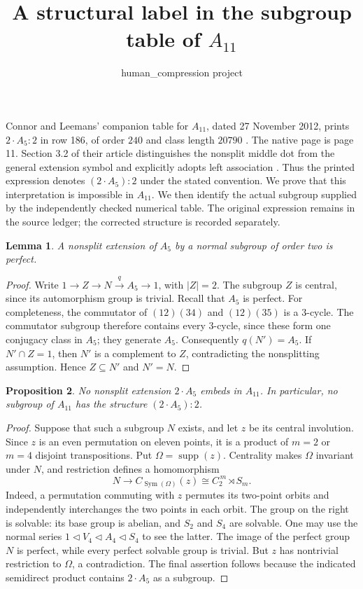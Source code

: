 \documentclass[11pt]{article}
\title{A structural label in the subgroup table of $A_{11}$}
\author{human\_compression project}
\date{}
\newtheorem{proposition}{Proposition}
\newtheorem{lemma}[proposition]{Lemma}
\newcommand{\Sym}{\operatorname{Sym}}
\begin{document}
\maketitle

Connor and Leemans' companion table for $A_{11}$, dated 27 November
2012, prints $2\cdot A_5:2$ in row 186, of order $240$ and class length
$20790$ \cite{table}. The native page is page 11. Section 3.2 of their
article distinguishes the nonsplit middle dot from the general extension
symbol and explicitly adopts left association \cite[p.~263]{atlas}.
Thus the printed expression denotes $(2\cdot A_5):2$ under the stated
convention. We prove that this interpretation is impossible in $A_{11}$.
We then identify the actual subgroup supplied by the independently checked
numerical table. The original expression remains in the source ledger;
the corrected structure is recorded separately.

\begin{lemma}
A nonsplit extension of $A_5$ by a normal subgroup of order two is perfect.
\end{lemma}
\begin{proof}
Write $1\to Z\to N\xrightarrow{q}A_5\to1$, with $|Z|=2$.
The subgroup $Z$ is central, since its automorphism group is trivial.
Recall that $A_5$ is perfect. For completeness, the commutator of
$(12)(34)$ and $(12)(35)$ is a $3$-cycle. The commutator subgroup
therefore contains every $3$-cycle, since these form one conjugacy class
in $A_5$; they generate $A_5$.
Consequently $q(N')=A_5$. If $N'\cap Z=1$, then $N'$ is a complement
to $Z$, contradicting the nonsplitting assumption. Hence $Z\subseteq N'$
and $N'=N$.
\end{proof}

\begin{proposition}
No nonsplit extension $2\cdot A_5$ embeds in $A_{11}$. In particular,
no subgroup of $A_{11}$ has the structure $(2\cdot A_5):2$.
\end{proposition}
\begin{proof}
Suppose that such a subgroup $N$ exists, and let $z$ be its central
involution. Since $z$ is an even permutation on eleven points, it is a
product of $m=2$ or $m=4$ disjoint transpositions. Put
$\Omega=\operatorname{supp}(z)$. Centrality makes $\Omega$ invariant
under $N$, and restriction defines a homomorphism
\[
 N\longrightarrow C_{\Sym(\Omega)}(z)
       \cong C_2^{\,m}\rtimes S_m.
\]
Indeed, a permutation commuting with $z$ permutes its two-point orbits
and independently interchanges the two points in each orbit.
The group on the right is solvable: its base group is abelian, and
$S_2$ and $S_4$ are solvable. One may use the normal series
$1\triangleleft V_4\triangleleft A_4\triangleleft S_4$ to see the latter.
The image of the perfect group $N$ is perfect, while every perfect
solvable group is trivial. But $z$ has nontrivial restriction to
$\Omega$, a contradiction. The final assertion follows because the
indicated semidirect product contains $2\cdot A_5$ as a subgroup.
\end{proof}
\end{document}
